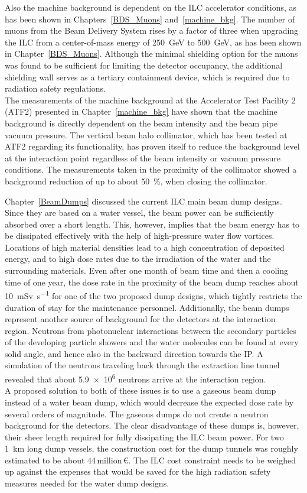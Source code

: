 Also the machine background is dependent on the ILC accelerator conditions, as has been shown in Chapters~\ref{BDS_Muons} and~\ref{machine_bkg}.
The number of muons from the Beam Delivery System rises by a factor of three when upgrading the ILC from a center-of-mass energy of \SI{250}{\GeV} to \SI{500}{\GeV}, as has been shown in Chapter~\ref{BDS_Muons}.
Although the minimal shielding option for the muons was found to be sufficient for limiting the \sid detector occupancy, the additional shielding wall serves as a tertiary containment device, which is required due to radiation safety regulations.
\\The measurements of the machine background at the Accelerator Test Facility 2 (ATF2) presented in Chapter~\ref{machine_bkg} have shown that the machine background is directly dependent on the beam intensity and the beam pipe vacuum pressure.
The vertical beam halo collimator, which has been tested at ATF2 regarding its functionality, has proven itself to reduce the background level at the interaction point regardless of the beam intensity or vacuum pressure conditions.
The measurements taken in the proximity of the collimator showed a background reduction of up to about \SI{50}{\percent}, when closing the collimator.

Chapter~\ref{BeamDumps} discussed the current ILC main beam dump designs.
Since they are based on a water vessel, the beam power can be sufficiently absorbed over a short length.
This, however, implies that the beam energy has to be dissipated effectively with the help of high-pressure water flow vortices.
Locations of high material densities lead to a high concentration of deposited energy, and to high dose rates due to the irradiation of the water and the surrounding materials. 
Even after one month of beam time and then a cooling time of one year, the dose rate in the proximity of the beam dump reaches about \SI{10}{\milli\sievert\per\second} for one of the two proposed dump designs, which tightly restricts the duration of stay for the maintenance personnel.
Additionally, the beam dumps represent another source of background for the detectors at the interaction region.
Neutrons from photonuclear interactions between the secondary particles of the developing particle showers and the water molecules can be found at every solid angle, and hence also in the backward direction towards the IP.
A simulation of the neutrons traveling back through the extraction line tunnel revealed that about \num{5.9e6} neutrons arrive at the interaction region.
\\A proposed solution to both of these issues is to use a gaseous beam dump instead of a water beam dump, which would decrease the expected dose rate by several orders of magnitude.
The gaseous dumps do not create a neutron background for the detectors.
The clear disadvantage of these dumps is, however, their sheer length required for fully dissipating the ILC beam power.
For two \SI{1}{\kilo\meter} long dump vessels, the construction cost for the dump tunnels was roughly estimated to be about 44\,million\,\euro.
The ILC cost constraint needs to be weighed up against the expenses that would be saved for the high radiation safety measures needed for the water dump designs.

